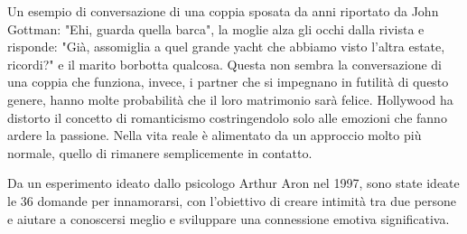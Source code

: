 \documentclass[12pt]{book} %
\begin{document}
Un esempio di conversazione di una coppia sposata da anni riportato da John Gottman: "Ehi, guarda
quella barca", la moglie alza gli occhi dalla rivista e risponde: "Già,
assomiglia a quel grande yacht che abbiamo visto l'altra estate, ricordi?" e
il marito borbotta qualcosa. Questa non sembra la conversazione di una coppia che funziona, invece, i partner che si
impegnano in futilità di questo genere, hanno molte probabilità che il loro matrimonio sarà felice.
Hollywood ha distorto il concetto di romanticismo costringendolo solo alle emozioni che fanno ardere la passione. Nella
vita reale è alimentato da un approccio molto più normale, quello di rimanere semplicemente in contatto. 

Da un esperimento ideato dallo psicologo Arthur Aron nel 1997, sono state ideate le 36 domande per innamorarsi, con l'obiettivo di creare intimità tra due persone e aiutare a conoscersi meglio e sviluppare una connessione emotiva significativa. 
\end{document}
